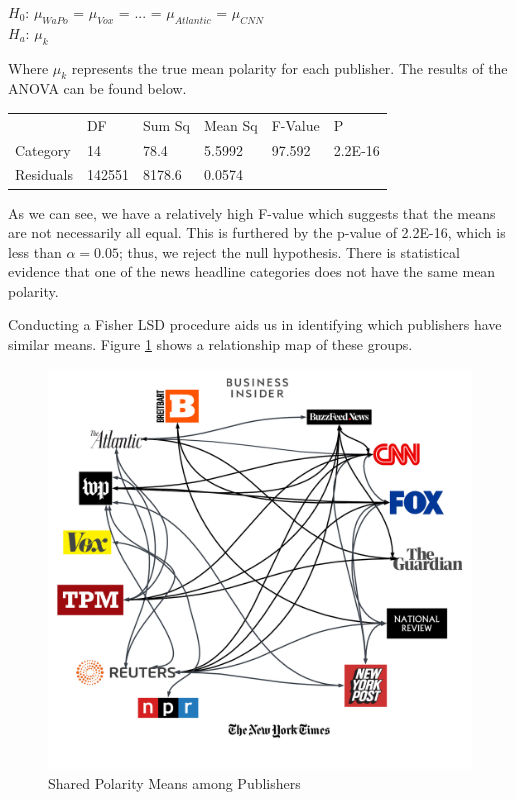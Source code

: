 \documentclass[12pt]{article}
\begin{document}
\begin{center}
    $H_{0}$: $\mu_{WaPo}$ = $\mu_{Vox}$ = ... = $\mu_{Atlantic}$ = $\mu_{CNN}$ \\
    $H_{a}$: \;$\mu_{k}$\;\\
\end{center}

Where $\mu_{k}$ represents the true mean polarity for each publisher. The results of the ANOVA can be found below.

\begin{table}[H]
    \centering
    \begin{tabular}{|llllll|}
    \hline
                                    & DF     & Sum Sq & Mean Sq & F-Value & P       \\ \cline{2-6} 
    \multicolumn{1}{|l|}{Category}  & 14     & 78.4   & 5.5992  & 97.592  & 2.2E-16 \\
    \multicolumn{1}{|l|}{Residuals} & 142551 & 8178.6 & 0.0574  &         &         \\ \hline
    \end{tabular}
\end{table}

As we can see, we have a relatively high F-value which suggests that the means are not necessarily all equal. This is furthered by the p-value of 2.2E-16, which is less than $\alpha = 0.05$; thus, we reject the null hypothesis. There is statistical evidence that one of the news headline categories does not have the same mean polarity.

Conducting a Fisher LSD procedure aids us in identifying which publishers have similar means. Figure \ref{fig:relationships} shows a relationship map of these groups.

\begin{figure}[H]
    \centering
    \includegraphics[width=1\textwidth]{images/relationships.png}
    \caption{Shared Polarity Means among Publishers}
    \label{fig:relationships}
\end{figure}
\end{document}
